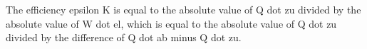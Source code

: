 The efficiency epsilon K is equal to the absolute value of Q dot zu divided by the absolute value of W dot el, which is equal to the absolute value of Q dot zu divided by the difference of Q dot ab minus Q dot zu.